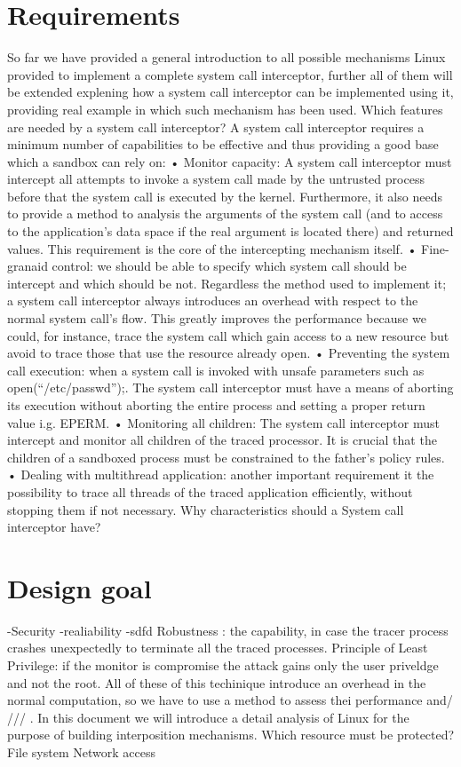 \section{Requirements}
So far we have provided a general introduction to all possible mechanisms Linux provided to implement a complete system call interceptor, further all of them will be extended explening how a system call interceptor can be implemented using it, providing real example in which such mechanism has been used.
Which features are needed by a system call interceptor?
A system call interceptor requires a minimum number of capabilities to be effective and thus providing a good base which a sandbox can rely on:
•	Monitor capacity:  A system call interceptor must intercept all attempts to invoke a system call made by the untrusted process before that the system call is executed by the kernel. Furthermore, it also needs to provide a method to analysis the arguments of the system call (and to access to the application’s data space if the real argument is located there) and returned values. This requirement is the core of the intercepting mechanism itself.  
•	Fine-granaid control: we should be able to specify which system call should be intercept and which should be not. Regardless the method used to implement it; a system call interceptor always introduces an overhead with respect to the normal system call’s flow. This greatly improves the performance because we could, for instance, trace the system call which gain access to a new resource but avoid to trace those that use the resource already open.    
•	Preventing the system call execution: when a system call is invoked with unsafe parameters such as open(“/etc/passwd”);. The system call interceptor must have a means of aborting its execution without aborting the entire process and setting a proper return value i.g. EPERM. 
•	Monitoring all children:  The system call interceptor must intercept and monitor all children of the traced processor. It is crucial that the children of a sandboxed process must be constrained to the father's policy rules.
•	Dealing with multithread application: another important requirement it the possibility to trace all threads of the traced application efficiently, without stopping them if not necessary. 
Why characteristics should a System call interceptor have?  \section{Design goal} 
-Security 
-realiability 
-sdfd
Robustness : the capability, in case the tracer process crashes unexpectedly to terminate all the traced processes.  
Principle of Least Privilege: 	 if the monitor is compromise the attack gains only the user priveldge and not the root. 
All of these of this techinique introduce an overhead in the normal computation, so we have to use a method to assess thei performance and/ ///
. In this document we will introduce a detail analysis of Linux for the purpose of building interposition mechanisms. 
Which resource must be protected? 
	File system
	Network access 

